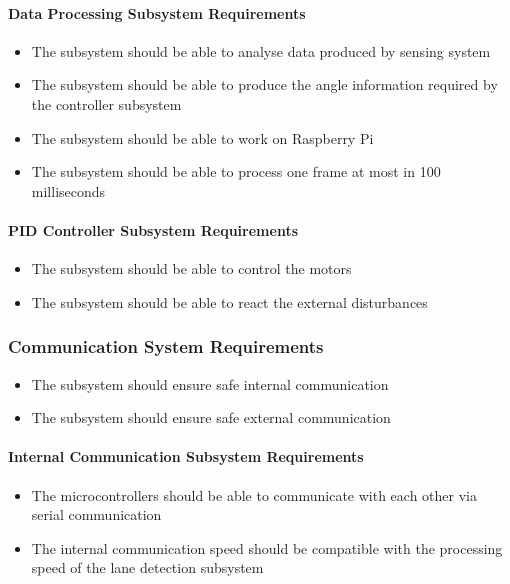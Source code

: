 \documentclass[a4paper,12pt]{article}
\begin{document}
	
	\paragraph{Data Processing Subsystem Requirements}	
	
		\begin{itemize}
			\item The subsystem should be able to analyse data produced by sensing system
			\item The subsystem should be able to produce the angle information required by the controller subsystem
			\item The subsystem should be able to work on Raspberry Pi
			\item The subsystem should be able to process one frame at most in 100 milliseconds
		\end{itemize}
		
	\paragraph{PID Controller Subsystem Requirements}
	
		\begin{itemize}
			\item The subsystem should be able to control the motors
			\item The subsystem should be able to react the external disturbances
		\end{itemize}
	
	\subsubsection{Communication System Requirements}
		
		\begin{itemize}
			\item The subsystem should ensure safe internal communication
			\item The subsystem should ensure safe external communication
		\end{itemize}
	
	\paragraph{Internal Communication Subsystem Requirements}

		\begin{itemize}
			\item The microcontrollers should be able to communicate with each other via serial communication
			\item The internal communication speed should be compatible with the processing speed of the lane detection subsystem  
		\end{itemize}
	
\end{document}
